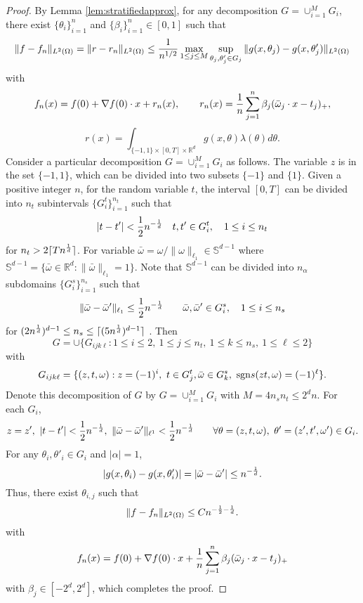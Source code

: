 \begin{proof}
By Lemma \ref{lem:stratifiedapprox}, for any decomposition $G=\cup_{i=1}^M G_i$, there exist $\{\theta_i\}_{i=1}^n$ and $\{\beta_i\}_{i=1}^n\in [0,1]$ such that 
\begin{equation}
\|  f - f_n\|_{L^2(\Omega)} = \|  r - r_{n}\|_{L^2(\Omega)} \leq {1\over n^{1/2}}\max_{1\le j\le M}\sup_{\theta_{j},\theta_{j}'\in G_j} \|   g(x,\theta_j) - g(x,\theta_j') \|_{L^2(\Omega)} 
\end{equation}
with 
$$
f_n(x)= f(0) +  \nabla  f(0) \cdot x + r_{n}(x), \qquad r_{n}(x)={1\over n}\sum_{j=1}^{n}\beta_j (\bar \omega_j\cdot x - t_j)_+, 
$$
$$
r(x)=\int_{\{-1,1\}\times [0,T]\times \mathbb{R}^{d}}  g(x, \theta)\lambda(\theta)d\theta.
$$
Consider a particular decomposition $G=\cup_{i=1}^M G_i$ as follows. 
The variable $z$ is in the set $\{-1,1\}$, which can be divided into two subsets $\{-1\}$ and $\{1\}$. 
Given a positive integer $n$, for the random variable $t$, the interval  $ [0,T]$ can be divided into $n_t$ subintervals $\{G_i^t\}_{i=1}^{n_t}$ such that 
$$
|t-t'|<{1\over 2}n^{-{1\over d}}\quad t,t'\in G_i^t,\quad 1\leq i\leq n_t
$$ 
for $n_t>2\lceil T  n^{1\over d}\rceil$. 
For variable $\bar \omega=\omega/\|\omega\|_{\ell_1}\in \mathbb{S}^{d-1}$ where $\mathbb{S}^{d-1}=\{\bar \omega\in \mathbb{R}^d: \|\bar \omega\|_{\ell_1}=1\}$. Note that $\mathbb{S}^{d-1}$ can be divided into $n_\alpha$ subdomains $\{G_i^s \}_{i=1}^{n_s}$ such that
$$
\|\bar \omega- \bar \omega'\|_{\ell_1}\leq {1\over 2}n^{-{1\over d}}\qquad \bar \omega, \bar \omega' \in G_i^s,\quad 1\leq i\leq n_s
$$
for $(2n^{1\over d})^{d-1}\leq n_s\leq \lceil (5n^{1\over d})^{d-1}\rceil$ \cite{klusowski2016uniform}.
Then 
$$
G=\displaystyle \cup \{G_{ijk\ell}: 1\leq i\leq 2,\ 1\leq j\leq n_t,\ 1\leq k\leq n_s,\ 1\le \ell\le 2\}
$$
with 
\begin{equation}
G_{ijk\ell} = \{(z, t, \omega): z=(-1)^i,\ t\in G_j^t, \bar \omega \in G_k^s,\ {\rm sgn} s(zt,\omega)=(-1)^\ell\}.
\end{equation}
Denote this decomposition of $G$ by $G=\cup_{i=1}^{M} G_i$ with $M=4n_sn_t\le 2^{d}n$. For each $G_i$,
\begin{equation}
z=z',\ |t-t'|<{1\over 2}n^{-{1\over d}},\ \|\bar \omega  - \bar \omega'\|_{\ell^1}<{1\over 2}n^{-{1\over d}}\qquad \forall \theta=(z, t, \omega),\ \theta'=(z', t', \omega')\in G_i.
\end{equation}
For any $\theta_i, \theta'_i\in G_i$ and $|\alpha |=1$,  
$$
| g(x,\theta_i) - g(x,\theta_i') | =  | \bar\omega  -   \bar\omega' |\le n^{-{1\over d}}.
$$  
Thus, there exist $\theta_{i,j}$ such that
\begin{equation}
\| f - f_n\|_{L^2(\Omega)} \le C  n^{-{1\over 2}-{1\over d}}.
\end{equation}
with
$$
f_n(x)=  f(0) + \nabla f(0) \cdot x + {1\over  n}\sum_{j=1}^{n}\beta_j (\bar \omega_j\cdot x - t_j)_+
$$ 
with $\beta_j\in [-2^d,2^d]$,
which completes the proof.
\end{proof}


\fi
 
















